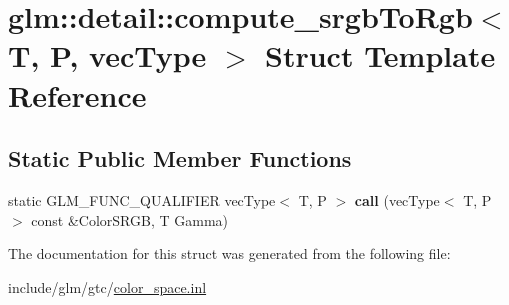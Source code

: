 \hypertarget{structglm_1_1detail_1_1compute__srgbToRgb}{}\section{glm\+:\+:detail\+:\+:compute\+\_\+srgb\+To\+Rgb$<$ T, P, vec\+Type $>$ Struct Template Reference}
\label{structglm_1_1detail_1_1compute__srgbToRgb}
\subsection*{Static Public Member Functions}
\begin{DoxyCompactItemize}
\item 
\mbox{\label{structglm_1_1detail_1_1compute__srgbToRgb_a73d176e6c80940ded57f4e76dc362f72}} 
static G\+L\+M\+\_\+\+F\+U\+N\+C\+\_\+\+Q\+U\+A\+L\+I\+F\+I\+ER vec\+Type$<$ T, P $>$ {\bfseries call} (vec\+Type$<$ T, P $>$ const \&Color\+S\+R\+GB, T Gamma)
\end{DoxyCompactItemize}


The documentation for this struct was generated from the following file\+:\begin{DoxyCompactItemize}
\item 
include/glm/gtc/\hyperlink{gtc_2color__space_8inl}{color\+\_\+space.\+inl}\end{DoxyCompactItemize}
